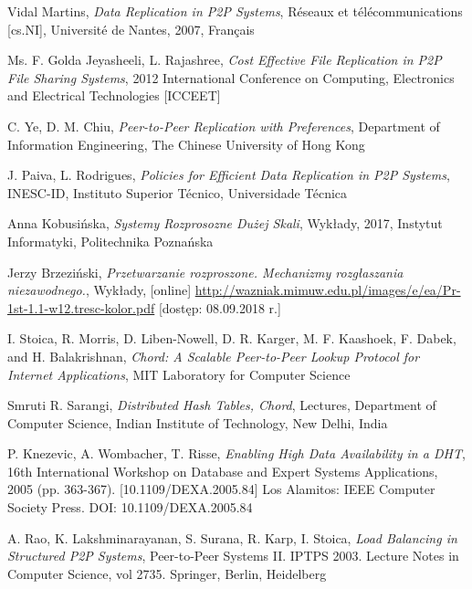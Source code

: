 \documentclass[12pt, twoside, openany]{report}
\begin{document}
\begin{thebibliography}{11}

 Vidal Martins, \emph{Data Replication in P2P Systems}, Réseaux et télécommunications [cs.NI], Université de Nantes, 2007, Français

 Ms. F. Golda Jeyasheeli, L. Rajashree, \emph{Cost Effective File Replication in P2P File Sharing Systems}, 2012 International Conference on Computing, Electronics and Electrical Technologies [ICCEET]
 
 C. Ye, D. M. Chiu, \emph{Peer-to-Peer Replication with Preferences}, Department of Information Engineering, The Chinese University of Hong Kong

 J. Paiva, L. Rodrigues, \emph{Policies for Efficient Data Replication in P2P Systems}, INESC-ID, Instituto Superior Técnico, Universidade Técnica

 Anna Kobusińska, \emph{Systemy Rozprosozne Dużej Skali}, Wykłady, 2017, Instytut Informatyki, Politechnika Poznańska

 Jerzy Brzeziński, \emph{Przetwarzanie rozproszone. Mechanizmy rozgłaszania niezawodnego.}, Wykłady, [online] \url{http://wazniak.mimuw.edu.pl/images/e/ea/Pr-1st-1.1-w12.tresc-kolor.pdf} [dostęp: 08.09.2018 r.]

  I. Stoica, R. Morris, D. Liben-Nowell, D. R. Karger, M. F. Kaashoek, F. Dabek, and H. Balakrishnan, \emph{Chord: A Scalable Peer-to-Peer Lookup Protocol for Internet Applications}, MIT Laboratory for Computer Science

 Smruti R. Sarangi, \emph{Distributed Hash Tables, Chord}, Lectures, Department of Computer Science, Indian Institute of Technology, New Delhi, India

 P. Knezevic, A. Wombacher, T. Risse, \emph{Enabling High Data Availability in a DHT}, 16th International Workshop on Database and Expert Systems Applications, 2005 (pp. 363-367). [10.1109/DEXA.2005.84] Los Alamitos: IEEE Computer Society Press. DOI: 10.1109/DEXA.2005.84

 A. Rao, K. Lakshminarayanan, S. Surana, R. Karp, I. Stoica, \emph{Load Balancing in Structured P2P Systems}, Peer-to-Peer Systems II. IPTPS 2003. Lecture Notes in Computer Science, vol 2735. Springer, Berlin, Heidelberg


\end{thebibliography}
\end{document}
